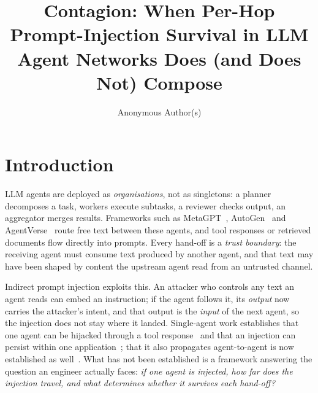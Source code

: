 \documentclass[sigconf,anonymous]{aamas}
\title[When Per-Hop Prompt-Injection Survival Composes]{Contagion: When Per-Hop Prompt-Injection Survival in LLM Agent Networks Does (and Does Not) Compose}
\author{Anonymous Author(s)}
\affiliation{
  \institution{Anonymous Institution}
  \city{Anonymous City}
  \country{Anonymous Country}}
\begin{document}
\setlength{\emergencystretch}{2.5em}




\maketitle


\section{Introduction}

LLM agents are deployed as \emph{organisations}, not as singletons: a planner
decomposes a task, workers execute subtasks, a reviewer checks output, an
aggregator merges results. Frameworks such as MetaGPT~\cite{Hong2023MetaGPT},
AutoGen~\cite{Wu2024AutoGen} and AgentVerse~\cite{Chen2024AgentVerse} route free
text between these agents, and tool
responses or retrieved documents flow directly into prompts. Every hand-off is a
\emph{trust boundary}: the receiving agent must consume text produced by another
agent, and that text may have been shaped by content the upstream agent read from
an untrusted channel.

Indirect prompt injection exploits this. An attacker who controls any text an
agent reads can embed an instruction; if the agent follows it, its \emph{output}
now carries the attacker's intent, and that output is the \emph{input} of the next
agent, so the injection does not stay where it landed. Single-agent work
establishes that one agent can be hijacked through a tool
response~\cite{Zhan2024InjecAgent,Debenedetti2024AgentDojo,Zhang2025ASB} and that
an injection can persist within one application~\cite{Greshake2023}; that it also
propagates agent-to-agent is now established as well~\cite{Lee2025Infection,An2026ACIARena}.
What has not been established is a framework answering the question an engineer
actually faces: \emph{if one agent is injected, how far does the injection travel,
and what determines whether it survives each hand-off?}
\end{document}

